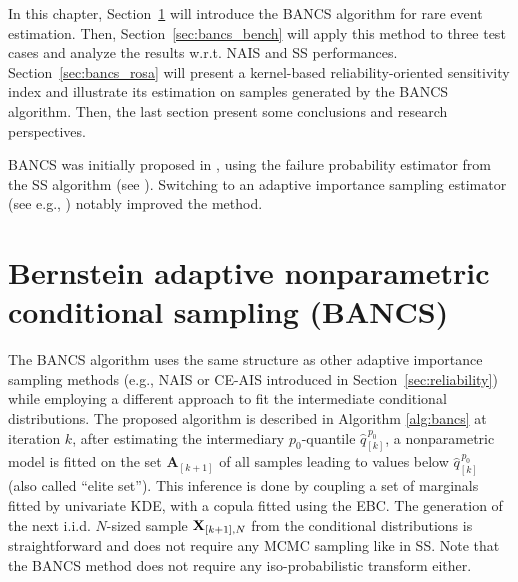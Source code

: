 In this chapter, Section~\ref{sec:bancs} will introduce the BANCS algorithm for rare event estimation. 
Then, Section~\ref{sec:bancs_bench} will apply this method to three test cases and analyze the results w.r.t. NAIS and SS performances. 
Section~\ref{sec:bancs_rosa} will present a kernel-based reliability-oriented sensitivity index and illustrate its estimation on samples generated by the BANCS algorithm. 
Then, the last section present some conclusions and research perspectives.

\begin{remark}
    BANCS was initially proposed in \citet{fekhari_ICASP_2023}, using the failure probability estimator from the SS algorithm (see ). 
    Switching to an adaptive importance sampling estimator (see e.g., ) notably improved the method.    
\end{remark}



\section{Bernstein adaptive nonparametric conditional sampling (BANCS)}\label{sec:bancs}

The BANCS algorithm uses the same structure as other adaptive importance sampling methods (e.g., NAIS or CE-AIS introduced in Section~\ref{sec:reliability}) while employing a different approach to fit the intermediate conditional distributions. 
The proposed algorithm is described in Algorithm \ref{alg:bancs} at iteration $k$, after estimating the intermediary $p_0$-quantile $\widehat{q}_{[k]}^{\, p_0}$, a nonparametric model is fitted on the set $\mathbf{A}_{[k+1]}$ of all samples leading to values below $\widehat{q}_{[k]}^{\, p_0}$ (also called ``elite set'').  
This inference is done by coupling a set of marginals fitted by univariate KDE, with a copula fitted using the EBC. 
The generation of the next i.i.d. $N$-sized sample ${\bf X}_{[k+1], N}$ from the conditional distributions is straightforward and does not require any MCMC sampling like in SS. 
Note that the BANCS method does not require any iso-probabilistic transform either.

